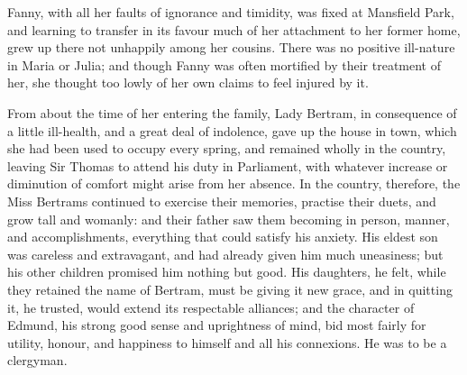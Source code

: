 Fanny, with all her faults of ignorance and timidity,
was fixed at Mansfield Park, and learning to transfer
in its favour much of her attachment to her former home,
grew up there not unhappily among her cousins.  There was
no positive ill-nature in Maria or Julia; and though
Fanny was often mortified by their treatment of her,
she thought too lowly of her own claims to feel injured
by it.

From about the time of her entering the family,
Lady Bertram, in consequence of a little ill-health,
and a great deal of indolence, gave up the house in town,
which she had been used to occupy every spring,
and remained wholly in the country, leaving Sir Thomas
to attend his duty in Parliament, with whatever increase
or diminution of comfort might arise from her absence.
In the country, therefore, the Miss Bertrams continued
to exercise their memories, practise their duets, and grow
tall and womanly:  and their father saw them becoming
in person, manner, and accomplishments, everything that
could satisfy his anxiety.  His eldest son was careless
and extravagant, and had already given him much uneasiness;
but his other children promised him nothing but good.
His daughters, he felt, while they retained the name
of Bertram, must be giving it new grace, and in quitting it,
he trusted, would extend its respectable alliances;
and the character of Edmund, his strong good sense
and uprightness of mind, bid most fairly for utility,
honour, and happiness to himself and all his connexions.
He was to be a clergyman.


